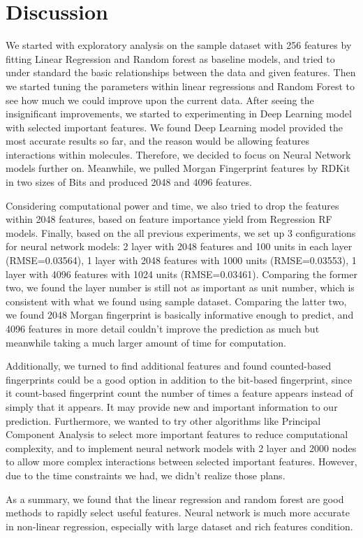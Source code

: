 \documentclass[11pt]{article}
\begin{document}


\section{Discussion} 
We started with exploratory analysis on the sample dataset with 256 features by fitting Linear Regression and Random forest as baseline models, and tried to under standard the basic relationships between the data and given features. Then we started tuning the parameters within linear regressions and Random Forest to see how much we could improve upon the current data. After seeing the insignificant improvements, we started to experimenting in Deep Learning model with selected important features. We found Deep Learning model provided the most accurate results so far, and the reason would be allowing features interactions within molecules. Therefore, we decided to focus on Neural Network models further on. Meanwhile, we pulled Morgan Fingerprint features by RDKit in two sizes of Bits and produced 2048 and 4096 features. 

Considering computational power and time, we also tried to drop the features within 2048 features, based on feature importance yield from Regression RF models. Finally, based on the all previous experiments, we set up 3 configurations for neural network models: 2 layer with 2048 features and 100 units in each layer (RMSE=0.03564), 1 layer with 2048 features with 1000 units (RMSE=0.03553), 1 layer with 4096 features with 1024 units (RMSE=0.03461). Comparing the former two, we found the layer number is still not as important as unit number, which is consistent with what we found using sample dataset. Comparing the latter two, we found 2048 Morgan fingerprint is basically informative enough to predict, and 4096 features in more detail couldn't improve the prediction as much but meanwhile taking a much larger amount of time for computation.

Additionally, we turned to find additional features and found counted-based fingerprints could be a good option in addition to the bit-based fingerprint, since it count-based fingerprint count the number of times a feature appears instead of simply that it appears. It may provide new and important information to our prediction. Furthermore, we wanted to try other algorithms like Principal Component Analysis to select more important features to reduce computational complexity, and to implement neural network models with 2 layer and 2000 nodes to allow more complex interactions between selected important features. However, due to the time constraints we had, we didn't realize those plans.

As a summary, we found that the linear regression and random forest are good methods to rapidly select useful features. Neural network is much more accurate in non-linear regression, especially with large dataset and rich features condition.
\end{document}
